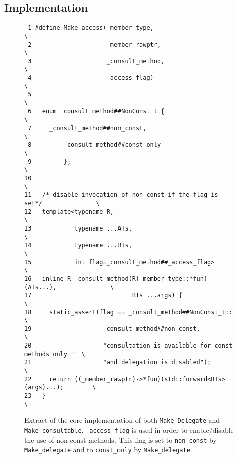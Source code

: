 \documentclass{article}
\begin{document}
\subsection{Implementation}

\begin{figure}[ht]
{\small
\begin{lstlisting}
 1 #define Make_access(_member_type,                                       \
 2                     _member_rawptr,                                     \
 3                     _consult_method,                                    \
 4                     _access_flag)                                       \
 5                                                                         \
 6   enum _consult_method##NonConst_t {                                    \
 7     _consult_method##non_const,                                         \
 8         _consult_method##const_only                                     \
 9         };                                                              \
10                                                                         \
11   /* disable invocation of non-const if the flag is set*/               \
12   template<typename R,                                                  \
13            typename ...ATs,                                             \
14            typename ...BTs,                                             \
15            int flag=_consult_method##_access_flag>                      \
16   inline R _consult_method(R(_member_type::*fun)(ATs...),               \
17                            BTs ...args) {                               \
18     static_assert(flag == _consult_method##NonConst_t::                 \
19                    _consult_method##non_const,                          \
20                    "consultation is available for const methods only "  \
21                    "and delegation is disabled");                       \
22     return ((_member_rawptr)->*fun)(std::forward<BTs>(args)...);        \
23   }                                                                     \
\end{lstlisting}}
\cprotect\caption{Extract of the core implementation of both \verb+Make_Delegate+ and \verb+Make_consultable+. \verb+_access_flag+ is used in order to enable/disable the use of non const methods. This flag is set to \verb+non_const+ by \verb+Make_delegate+ and to \verb+const_only+ by \verb+Make_delegate+.}
\label{impl:flag}
\end{figure}
\end{document}
